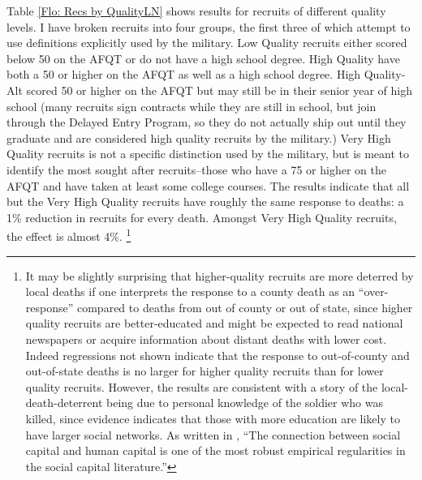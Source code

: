 \documentclass[12pt] {article}
\begin{document}
Table \ref{Flo: Recs by QualityLN} shows results for recruits
of different quality levels. I have broken recruits into four groups, the first three of which attempt to use definitions explicitly used by the military.
Low Quality recruits either scored below 50 on the AFQT or do not
have a high school degree. High Quality have both a 50 or higher on
the AFQT as well as a high school degree. High Quality-Alt scored
50 or higher on the AFQT but may still be in their senior year of
high school (many recruits sign contracts while they are still in
school, but join through the Delayed Entry Program, so they do not
actually ship out until they graduate and are considered high quality
recruits by the military.) Very High Quality recruits is not a specific
distinction used by the military, but is meant to identify the most
sought after recruits--those who have a 75 or higher on the AFQT and
have taken at least some college courses. %
The results indicate that all but the Very High Quality recruits have roughly the same response to deaths: a 1\% reduction in recruits for every
death. Amongst Very High Quality recruits, the effect is almost 4\%.%
\footnote{It may be slightly surprising that higher-quality recruits are more
deterred by local deaths if one interprets the response to a county
death as an {}``over-response'' compared to deaths from out of county
or out of state, since higher quality recruits are better-educated
and might be expected to read national newspapers or acquire information
about distant deaths with lower cost. Indeed regressions not shown
indicate that the response to out-of-county and out-of-state deaths
is no larger for higher quality recruits than for lower quality recruits.
However, the results are consistent with a story of the local-death-deterrent
being due to personal knowledge of the soldier who was killed, since
evidence indicates that those with more education are likely to have
larger social networks. As written in \cite{GlaeserSocialNetworks},
{}``The connection between social capital and human capital is one
of the most robust empirical regularities in the social capital literature.''} 
\end{document}
